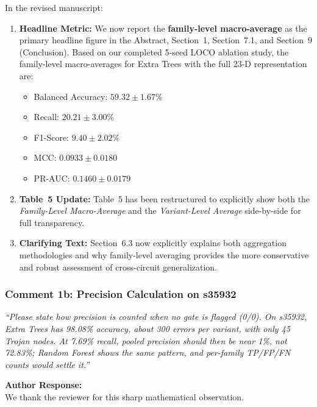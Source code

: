 \documentclass[11pt,a4paper]{article}
\newcommand{\reviewercomment}[1]{\vspace{4pt}\noindent\textcolor{revcomment}{\textit{``#1''}}\vspace{4pt}}
\newcommand{\authorresponse}{\noindent\textbf{Author Response:}}
\begin{document}
In the revised manuscript:
\begin{enumerate}[leftmargin=*]
    \item \textbf{Headline Metric:} We now report the \textbf{family-level macro-average} as the primary headline figure in the Abstract, Section~1, Section~7.1, and Section~9 (Conclusion). Based on our completed 5-seed LOCO ablation study, the family-level macro-averages for Extra Trees with the full 23-D representation are:
    \begin{itemize}
        \item Balanced Accuracy: $\mathbf{59.32 \pm 1.67\%}$
        \item Recall: $\mathbf{20.21 \pm 3.00\%}$
        \item F1-Score: $\mathbf{9.40 \pm 2.02\%}$
        \item MCC: $\mathbf{0.0933 \pm 0.0180}$
        \item PR-AUC: $\mathbf{0.1460 \pm 0.0179}$
    \end{itemize}
    \item \textbf{Table~5 Update:} Table~5 has been restructured to explicitly show both the \textit{Family-Level Macro-Average} and the \textit{Variant-Level Average} side-by-side for full transparency.
    \item \textbf{Clarifying Text:} Section~6.3 now explicitly explains both aggregation methodologies and why family-level averaging provides the more conservative and robust assessment of cross-circuit generalization.
\end{enumerate}

\subsubsection*{Comment 1b: Precision Calculation on s35932}

\reviewercomment{Please state how precision is counted when no gate is flagged (0/0). On s35932, Extra Trees has 98.08\% accuracy, about 300 errors per variant, with only 45 Trojan nodes. At 7.69\% recall, pooled precision should then be near 1\%, not 72.83\%; Random Forest shows the same pattern, and per-family TP/FP/FN counts would settle it.}

\authorresponse\\
We thank the reviewer for this sharp mathematical observation.
\end{document}
